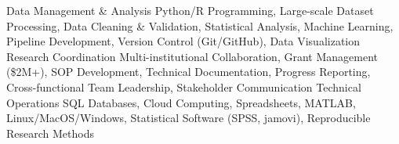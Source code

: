 
\begin{cvskills}

\cvskill
    {Data Management \& Analysis} %
    {Python/R Programming, Large-scale Dataset Processing, Data Cleaning \& Validation, Statistical Analysis, Machine Learning, Pipeline Development, Version Control (Git/GitHub), Data Visualization} %
\cvskill
    {Research Coordination} %
    {Multi-institutional Collaboration, Grant Management (\$2M+), SOP Development, Technical Documentation, Progress Reporting, Cross-functional Team Leadership, Stakeholder Communication} %
\cvskill
    {Technical Operations} %
    {SQL Databases, Cloud Computing, Spreadsheets, MATLAB, Linux/MacOS/Windows, Statistical Software (SPSS, jamovi), Reproducible Research Methods} %

\end{cvskills}
